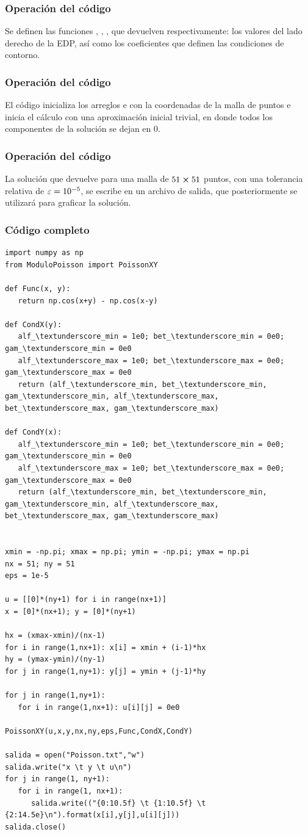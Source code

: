 \begin{frame}
\frametitle{Operación del código}
Se definen las funciones , , , que devuelven respectivamente: los valores del lado derecho de la EDP, así como los coeficientes que definen las condiciones de contorno.
\end{frame}
\begin{frame}
\frametitle{Operación del código}
El código inicializa los arreglos  e  con la coordenadas de la malla de puntos e inicia el cálculo con una aproximación inicial trivial, en donde todos los componentes de la solución se dejan en $0$.
\end{frame}
\begin{frame}
\frametitle{Operación del código}
La solución que devuelve  para una malla de $51 \cp 51$ puntos, con una tolerancia relativa de $\varepsilon = \num{d-5}$, se escribe en un archivo de salida, que posteriormente se utilizará para graficar la solución.
\end{frame}
\begin{frame}
\frametitle{Código completo}
\begin{lstlisting}[caption=Código para resolver la ec. de Poisson, style=FormattedNumber, basicstyle=\linespread{1.1}\ttfamily=\small, columns=fullflexible]
import numpy as np
from ModuloPoisson import PoissonXY

def Func(x, y):
   return np.cos(x+y) - np.cos(x-y)

def CondX(y):
   alf_\textunderscore_min = 1e0; bet_\textunderscore_min = 0e0; gam_\textunderscore_min = 0e0
   alf_\textunderscore_max = 1e0; bet_\textunderscore_max = 0e0; gam_\textunderscore_max = 0e0
   return (alf_\textunderscore_min, bet_\textunderscore_min, gam_\textunderscore_min, alf_\textunderscore_max, bet_\textunderscore_max, gam_\textunderscore_max)

def CondY(x):
   alf_\textunderscore_min = 1e0; bet_\textunderscore_min = 0e0; gam_\textunderscore_min = 0e0
   alf_\textunderscore_max = 1e0; bet_\textunderscore_max = 0e0; gam_\textunderscore_max = 0e0
   return (alf_\textunderscore_min, bet_\textunderscore_min, gam_\textunderscore_min, alf_\textunderscore_max, bet_\textunderscore_max, gam_\textunderscore_max)


xmin = -np.pi; xmax = np.pi; ymin = -np.pi; ymax = np.pi
nx = 51; ny = 51
eps = 1e-5

u = [[0]*(ny+1) for i in range(nx+1)]
x = [0]*(nx+1); y = [0]*(ny+1)

hx = (xmax-xmin)/(nx-1)
for i in range(1,nx+1): x[i] = xmin + (i-1)*hx
hy = (ymax-ymin)/(ny-1)
for j in range(1,ny+1): y[j] = ymin + (j-1)*hy

for j in range(1,ny+1):
   for i in range(1,nx+1): u[i][j] = 0e0

PoissonXY(u,x,y,nx,ny,eps,Func,CondX,CondY)

salida = open("Poisson.txt","w")
salida.write("x \t y \t u\n")
for j in range(1, ny+1):
   for i in range(1, nx+1):
      salida.write(("{0:10.5f} \t {1:10.5f} \t {2:14.5e}\n").format(x[i],y[j],u[i][j]))
salida.close()
\end{lstlisting}
\end{frame}
